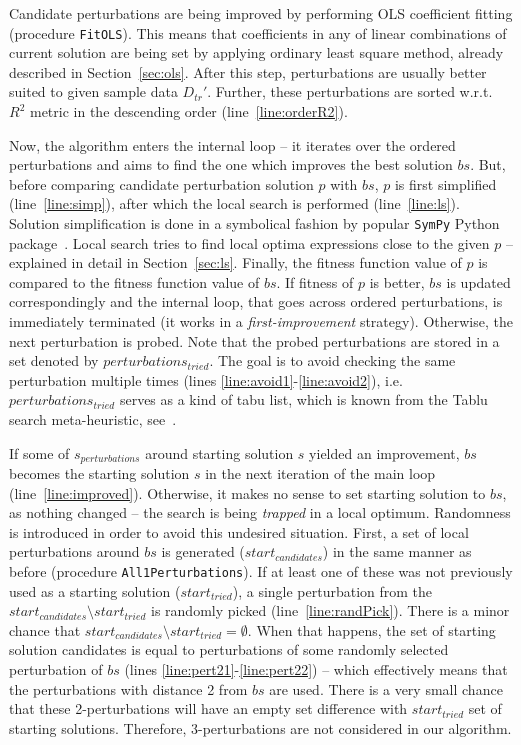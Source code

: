 \documentclass{bmcart}
\begin{document}
Candidate perturbations are being improved by performing OLS coefficient fitting (procedure \texttt{FitOLS}). This means that coefficients in any of linear combinations of current solution are being set by applying  ordinary least square method, already described in Section~\ref{sec:ols}. 
After this step, perturbations are usually better suited to given sample data $D_{tr}'$. 
Further, these perturbations are sorted w.r.t. $R^2$ metric in the descending order (line~\ref{line:orderR2}). 

Now, the algorithm enters the internal loop -- it iterates over the ordered perturbations and aims to find the one which improves the best solution $bs$. But, before comparing candidate perturbation solution $p$ with $bs$, $p$ is first simplified (line~\ref{line:simp}), after which the local search is performed (line~\ref{line:ls}).
Solution simplification is done in a symbolical fashion by popular \texttt{SymPy} Python package~\cite{sympy}.
Local search tries to find local optima expressions close to the given $p$ -- explained in detail in Section~\ref{sec:ls}.  
Finally, the fitness function value of $p$ is compared to the fitness function value of $bs$. If fitness of $p$ is better, $bs$ is updated correspondingly and the internal loop, that goes across ordered perturbations, is immediately terminated (it works in a  \emph{first-improvement} strategy). Otherwise, the next perturbation is probed. 
Note that the probed perturbations are stored in a set denoted by $perturbations_{tried}$. The goal is to avoid checking the same perturbation multiple times (lines \ref{line:avoid1}-\ref{line:avoid2}), i.e. $perturbations_{tried}$ serves as a kind of tabu list, which is known from the Tablu search meta-heuristic, see~\cite{glover1998tabu}.    


If some of $s_{perturbations}$ around starting solution $s$ yielded an improvement, $bs$ becomes the starting solution $s$ in the next iteration of the main loop (line~\ref{line:improved}). 
Otherwise, it makes no sense to set starting solution to $bs$, as nothing changed -- the search is being  \emph{trapped} in a local optimum. Randomness is introduced in order to avoid this undesired situation. First, a set of local perturbations around $bs$ is generated ($start_{candidates}$) in the same manner as before (procedure \texttt{All1Perturbations}). If at least one of these was not previously used as a starting solution ($start_{tried}$), a single perturbation from the $start_{candidates} \setminus start_{tried}$ is randomly picked (line~\ref{line:randPick}). There is a minor chance that $start_{candidates} \setminus start_{tried} = \emptyset$. When that happens, the set of starting solution candidates is equal to perturbations of some randomly selected perturbation of $bs$ (lines \ref{line:pert21}-\ref{line:pert22}) -- which effectively means that the perturbations with distance 2 from $bs$ are used. There is a very small chance that these 2-perturbations will have an empty set difference with $start_{tried}$ set of starting solutions. Therefore, 3-perturbations are not considered in our algorithm. 
\end{document}
